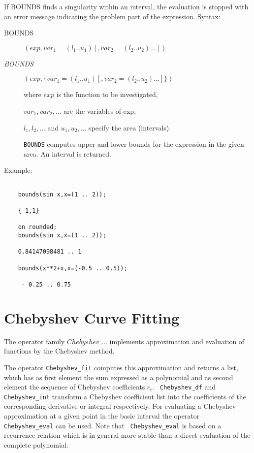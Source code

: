 If BOUNDS finds a singularity within an interval, the evaluation
is stopped with an error message indicating the problem part
of the expression.
\newpage
Syntax:

\begin{description}
\item[BOUNDS]$(exp,var_1=(l_1 .. u_1) [,var_2=(l_2 .. u_2) \ldots])$

\item[{\it BOUNDS}]$(exp,\{var_1=(l_1 .. u_1) [,var_2=(l_2 .. u_2)\ldots]\})$

where $exp$ is the function to be investigated,

$var_1, var_2 , \ldots$ are the variables of exp,

$l_1, l_2 , \ldots$  and  $u_1, u_2 , \ldots$ specify the area (intervals).

{\tt BOUNDS} computes upper and lower bounds for the expression in the
given area. An interval is returned.

\end{description}

Example:

\begin{verbatim}

    bounds(sin x,x=(1 .. 2));

    {-1,1}

    on rounded;
    bounds(sin x,x=(1 .. 2));

    0.84147098481 .. 1

    bounds(x**2+x,x=(-0.5 .. 0.5));

     - 0.25 .. 0.75

\end{verbatim}

\section{Chebyshev Curve Fitting}

The operator family $Chebyshev\_\ldots$ implements approximation
and evaluation of functions by the Chebyshev method.

The operator {\tt Chebyshev\_fit} computes
this approximation and returns a list, which has as first element the
sum expressed as a polynomial and as second element the sequence of
Chebyshev coefficients ${c_i}$.  {\tt
Chebyshev\_df} and {\tt
Chebyshev\_int} transform a Chebyshev
coefficient list into the coefficients of the corresponding derivative
or integral respectively. For evaluating a Chebyshev approximation at
a given point in the basic interval the operator {\tt
Chebyshev\_eval} can be used. Note that {\tt
Chebyshev\_eval} is based on a recurrence relation which is in general
more stable than a direct evaluation of the complete polynomial.

